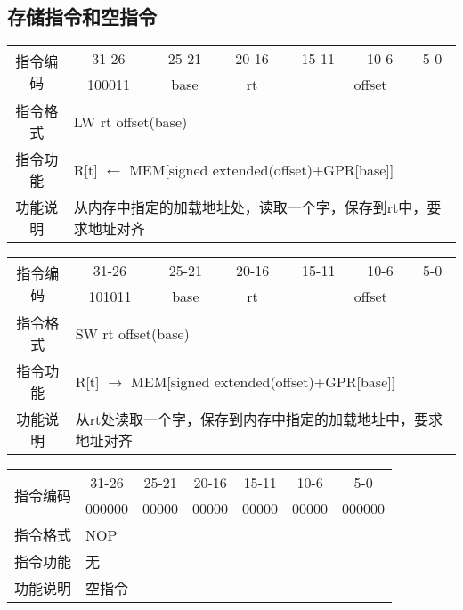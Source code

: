 \subsection{存储指令和空指令}
	\begin{table}[!hbp]
		\centering
		\begin{tabular}{|c|c|c|c|c|c|c|}
		\hline
		\multirow{2}{*}{指令编码} & 31-26&25-21 & 20-16&15-11 &10-6 &5-0\\
		\cline{2-7} & 100011 & base & rt & \multicolumn{3}{|c|}{offset} \\
		\hline
		指令格式&\multicolumn{6}{|l|}{LW rt offset(base)}\\
		\hline		
		指令功能&\multicolumn{6}{|l|}{R[t] $\leftarrow$ MEM[signed extended(offset)+GPR[base]]}\\
		\hline		
		功能说明&\multicolumn{6}{|l|}{从内存中指定的加载地址处，读取一个字，保存到rt中，要求地址对齐}\\
		\hline
		\end{tabular}
	\end{table}
	\begin{table}[!hbp]
		\centering
		\begin{tabular}{|c|c|c|c|c|c|c|}
		\hline
		\multirow{2}{*}{指令编码} & 31-26&25-21 & 20-16&15-11 &10-6 &5-0\\
		\cline{2-7} & 101011 & base & rt & \multicolumn{3}{|c|}{offset} \\
		\hline
		指令格式&\multicolumn{6}{|l|}{SW rt offset(base)}\\
		\hline		
		指令功能&\multicolumn{6}{|l|}{R[t] $\rightarrow$ MEM[signed extended(offset)+GPR[base]]}\\
		\hline		
		功能说明&\multicolumn{6}{|l|}{从rt处读取一个字，保存到内存中指定的加载地址中，要求地址对齐}\\
		\hline
		\end{tabular}
	\end{table}
	\begin{table}[!hbp]
		\centering
		\begin{tabular}{|c|c|c|c|c|c|c|}
		\hline
		\multirow{2}{*}{指令编码} & 31-26&25-21 & 20-16&15-11 &10-6 &5-0\\
		\cline{2-7} & 000000 & 00000 & 00000 & 00000& 00000& 000000 \\
		\hline
		指令格式&\multicolumn{6}{|l|}{NOP}\\
		\hline		
		指令功能&\multicolumn{6}{|l|}{无}\\
		\hline		
		功能说明&\multicolumn{6}{|l|}{空指令}\\
		\hline
		\end{tabular}
	\end{table}
\newpage
